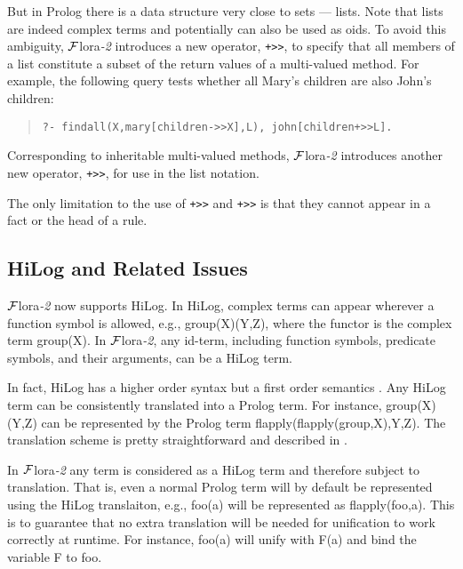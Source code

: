 \documentclass[11pt]{article}
\newcommand{\FLORA}{{\mbox{${\cal F}${\sc lora}\rm\emph{-2}}}\xspace}
\begin{document}
%
But in Prolog there is a data structure very close to sets --- lists.
Note that lists are indeed complex terms and potentially can also be
used as oids. To avoid this ambiguity, \FLORA introduces a new
operator, {\tt +>>}, to specify that all members of a list constitute
a subset of the return values of a multi-valued method. For example,
the following query tests whether all {\sf Mary}'s children are also
{\sf John}'s children:
\begin{quote}
\begin{verbatim}
?- findall(X,mary[children->>X],L), john[children+>>L].
\end{verbatim}
\end{quote}

Corresponding to inheritable multi-valued methods, \FLORA introduces
another new operator, {\tt *+>>}, for use in the list notation.

The only limitation to the use of {\tt +>>} and {\tt *+>>} is that
they cannot appear in a fact or the head of a rule.


\subsection{HiLog and Related Issues} \label{sec:hilog}


%
\FLORA now supports HiLog. In HiLog, complex terms can appear wherever
a function symbol is allowed, e.g., {\sf group(X)(Y,Z)}, where the
functor is the complex term {\sf group(X)}. In \FLORA, any id-term,
including function symbols, predicate symbols, and their arguments,
can be a HiLog term.

%
In fact, HiLog has a higher order syntax but a first order semantics
\cite{hilog-jlp}. Any HiLog term can be consistently translated into
a Prolog term. For instance, {\sf group(X)(Y,Z)} can be represented
by the Prolog term {\sf flapply(flapply(group,X),Y,Z)}. The translation
scheme is pretty straightforward and described in \cite{hilog-jlp}.

In \FLORA any term is considered as a HiLog term and therefore subject
to translation. That is, even a normal Prolog term will by default be
represented using the HiLog translaiton, e.g., {\sf foo(a)} will be
represented as {\sf flapply(foo,a)}. This is to guarantee that no
extra translation will be needed for unification to work correctly at
runtime. For instance, {\sf foo(a)} will unify with {\sf F(a)} and
bind the variable {\sf F} to {\sf foo}.
\end{document}
